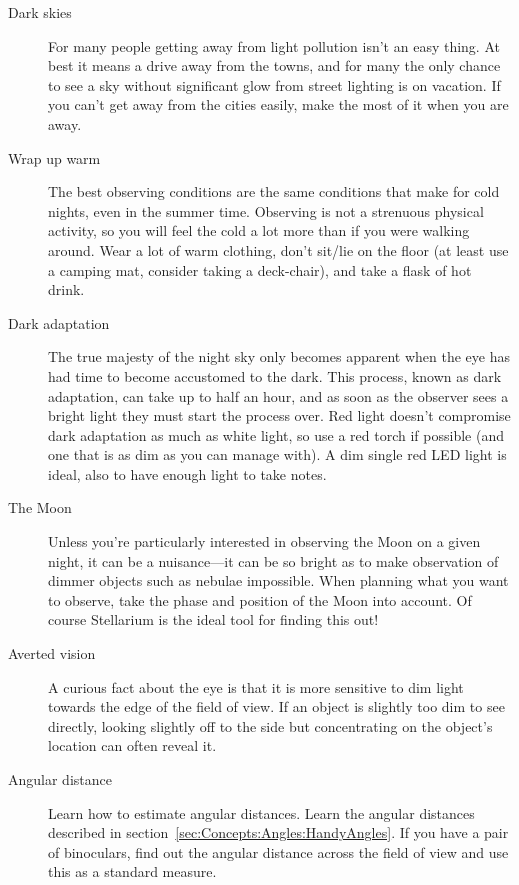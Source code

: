 \begin{description}
\item[Dark skies] For many people getting away from light pollution
isn't an easy thing. At best it means a drive away from the towns, and
for many the only chance to see a sky without significant glow from
street lighting is on vacation. If you can't get away from the cities
easily, make the most of it when you are away.

\item[Wrap up warm] The best observing conditions are the same
conditions that make for cold nights, even in the summer time. Observing
is not a strenuous physical activity, so you will feel the cold a lot
more than if you were walking around. Wear a lot of warm clothing, don't
sit/lie on the floor (at least use a camping mat, consider taking a
deck-chair), and take a flask of hot drink.

\item[Dark adaptation] The true majesty of the night sky only
becomes apparent when the eye has had time to become accustomed to the
dark.  This process, known as dark adaptation, can take up to half an
hour, and as soon as the observer sees a bright light they must start
the process over. Red light doesn't compromise dark adaptation as much
as white light, so use a red torch if possible (and one that is as dim
as you can manage with). A dim single red LED light is ideal, also to
have enough light to take notes.

\item[The Moon] Unless you're particularly interested in observing the
Moon on a given night, it can be a nuisance---it can be so bright as
to make observation of dimmer objects such as nebulae impossible. When
planning what you want to observe, take the phase and position of the
Moon into account. Of course Stellarium is the ideal tool for finding
this out!

\item[Averted vision] A curious fact about the eye is that it is more
sensitive to dim light towards the edge of the field of view. If an
object is slightly too dim to see directly, looking slightly off to the
side but concentrating on the object's location can often reveal it.

\item[Angular distance] Learn how to estimate angular distances. Learn
  the angular distances described in
  section~\ref{sec:Concepts:Angles:HandyAngles}. If you have a pair of
  binoculars, find out the angular distance across the field of view
  and use this as a standard measure.
\end{description}


